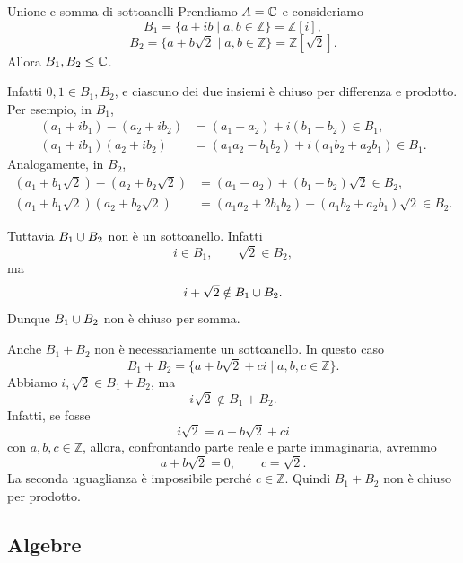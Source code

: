 \documentclass[a4paper]{article}
\begin{document}
\begin{radioactive}
\begin{snippetexample}{Unione e somma di sottoanelli}
    Prendiamo \(A=\mathbb{C}\) e consideriamo
    \[
        B_1=\{a+ib \mid a,b\in\mathbb{Z}\}=\mathbb{Z}[i],
    \]
    \[
        B_2=\{a+b\sqrt{2} \mid a,b\in\mathbb{Z}\}=\mathbb{Z}[\sqrt{2}].
    \]
    Allora \(B_1,B_2\leq \mathbb{C}\).

    Infatti \(0,1\in B_1,B_2\), e ciascuno dei due insiemi è chiuso per differenza e prodotto.
    Per esempio, in \(B_1\),
    \begin{align*}
        (a_1+ib_1)-(a_2+ib_2)
        &=
        (a_1-a_2)+i(b_1-b_2)\in B_1, \\
        (a_1+ib_1)(a_2+ib_2)
        &=
        (a_1a_2-b_1b_2)+i(a_1b_2+a_2b_1)\in B_1.
    \end{align*}
    Analogamente, in \(B_2\),
    \begin{align*}
        (a_1+b_1\sqrt{2})-(a_2+b_2\sqrt{2})
        &=
        (a_1-a_2)+(b_1-b_2)\sqrt{2}\in B_2, \\
        (a_1+b_1\sqrt{2})(a_2+b_2\sqrt{2})
        &=
        (a_1a_2+2b_1b_2)+(a_1b_2+a_2b_1)\sqrt{2}\in B_2.
    \end{align*}

    Tuttavia \(B_1\cup B_2\) non è un sottoanello.
    Infatti
    \[
        i\in B_1,
        \qquad
        \sqrt{2}\in B_2,
    \]
    ma
    \[
        i+\sqrt{2}\notin B_1\cup B_2.
    \]
    Dunque \(B_1\cup B_2\) non è chiuso per somma.

    Anche \(B_1+B_2\) non è necessariamente un sottoanello.
    In questo caso
    \[
        B_1+B_2
        =
        \{a+b\sqrt{2}+ci \mid a,b,c\in\mathbb{Z}\}.
    \]
    Abbiamo \(i,\sqrt{2}\in B_1+B_2\), ma
    \[
        i\sqrt{2}\notin B_1+B_2.
    \]
    Infatti, se fosse
    \[
        i\sqrt{2}=a+b\sqrt{2}+ci
    \]
    con \(a,b,c\in\mathbb{Z}\), allora, confrontando parte reale e parte immaginaria, avremmo
    \[
        a+b\sqrt{2}=0,
        \qquad
        c=\sqrt{2}.
    \]
    La seconda uguaglianza è impossibile perché \(c\in\mathbb{Z}\).
    Quindi \(B_1+B_2\) non è chiuso per prodotto.
\end{snippetexample}
\end{radioactive}

\subsection{Algebre}
\end{document}
